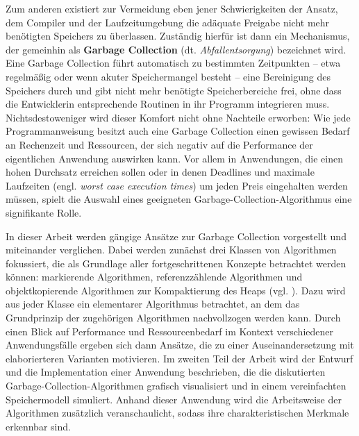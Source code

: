 Zum anderen existiert zur Vermeidung eben jener Schwierigkeiten der Ansatz, dem Compiler und der Laufzeitumgebung die adäquate Freigabe nicht mehr benötigten Speichers zu überlassen.
Zuständig hierfür ist dann ein Mechanismus, der gemeinhin als \textbf{Garbage Collection} (dt. \textit{Abfallentsorgung}) bezeichnet wird.
Eine Garbage Collection führt automatisch zu bestimmten Zeitpunkten -- etwa regelmäßig oder wenn akuter Speichermangel besteht -- eine Bereinigung des Speichers durch und gibt nicht mehr benötigte Speicherbereiche frei, ohne dass die Entwicklerin entsprechende Routinen in ihr Programm integrieren muss.
Nichtsdestoweniger wird dieser Komfort nicht ohne Nachteile erworben:
Wie jede Programmanweisung besitzt auch eine Garbage Collection einen gewissen Bedarf an Rechenzeit und Ressourcen, der sich negativ auf die Performance der eigentlichen Anwendung auswirken kann.
Vor allem in Anwendungen, die einen hohen Durchsatz erreichen sollen oder in denen Deadlines und maximale Laufzeiten (engl. \textit{worst case execution times}) um jeden Preis eingehalten werden müssen, spielt die Auswahl eines geeigneten Garbage-Collection-Algorithmus eine signifikante Rolle.

In dieser Arbeit werden gängige Ansätze zur Garbage Collection vorgestellt und miteinander verglichen.
Dabei werden zunächst drei Klassen von Algorithmen fokussiert, die als Grundlage aller fortgeschrittenen Konzepte betrachtet werden können: markierende Algorithmen, referenzzählende Algorithmen und objektkopierende Algorithmen zur Kompaktierung des Heaps (vgl. \cite[S. 25]{blackburn2004}).
Dazu wird aus jeder Klasse ein elementarer Algorithmus betrachtet, an dem das Grundprinzip der zugehörigen Algorithmen nachvollzogen werden kann.
Durch einen Blick auf Performance und Ressourcenbedarf im Kontext verschiedener Anwendungsfälle ergeben sich dann Ansätze, die zu einer Auseinandersetzung mit elaborierteren Varianten motivieren.
Im zweiten Teil der Arbeit wird der Entwurf und die Implementation einer Anwendung beschrieben, die die diskutierten Garbage-Collection-Algorithmen grafisch visualisiert und in einem vereinfachten Speichermodell simuliert.
Anhand dieser Anwendung wird die Arbeitsweise der Algorithmen zusätzlich veranschaulicht, sodass ihre charakteristischen Merkmale erkennbar sind.




